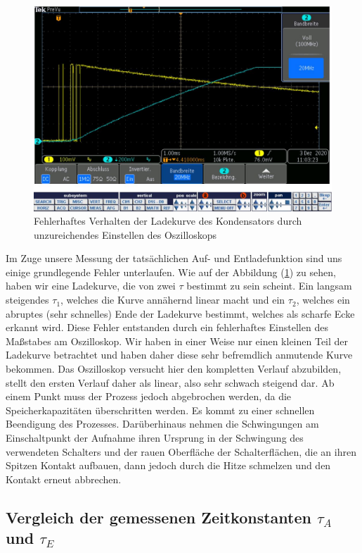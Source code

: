 \documentclass{article}
\begin{document}
\begin{figure}[h!]
  \begin{center}
    \includegraphics[scale=0.45]{../assets/images/ET2P4/aufgabe3Fehler.JPG}
    \caption{Fehlerhaftes Verhalten der Ladekurve des Kondensators durch unzureichendes Einstellen des Oszilloskops}
    \label{fig:error}
  \end{center}
\end{figure}

Im Zuge unsere Messung der tatsächlichen Auf- und Entladefunktion sind uns einige grundlegende Fehler unterlaufen. Wie auf der Abbildung (\ref{fig:error}) zu 
sehen, haben wir eine Ladekurve, die von zwei $\tau$ bestimmt zu sein scheint. Ein langsam steigendes $\tau_1$, welches die Kurve annähernd linear macht und ein 
$\tau_2$, welches ein abruptes (sehr schnelles) Ende der Ladekurve bestimmt, welches als scharfe Ecke erkannt wird. Diese Fehler entstanden durch ein fehlerhaftes Einstellen des Maßstabes am
Oszilloskop. Wir haben in einer Weise nur einen kleinen Teil der Ladekurve betrachtet und haben daher diese sehr befremdlich anmutende Kurve bekommen. Das Oszilloskop versucht hier den 
kompletten Verlauf abzubilden, stellt den ersten Verlauf daher als linear, also sehr schwach steigend dar. Ab einem Punkt muss der Prozess jedoch abgebrochen werden, da die Speicherkapazitäten überschritten werden.
Es kommt zu einer schnellen Beendigung des Prozesses.
Darüberhinaus nehmen die Schwingungen am Einschaltpunkt der Aufnahme ihren Ursprung in der Schwingung des verwendeten Schalters und der rauen Oberfläche der Schalterflächen, die an ihren Spitzen Kontakt aufbauen, dann jedoch
durch die Hitze schmelzen und den Kontakt erneut abbrechen.

\subsection{Vergleich der gemessenen Zeitkonstanten $\tau_A$ und $\tau_E$}
\end{document}
